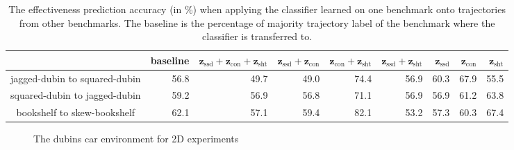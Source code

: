 \documentclass[letterpaper, 10 pt, conference]{ieeeconf}  %
\newcommand{\fssd}{\mbox{$\mathbf z_{\text{ssd}}$}}
\newcommand{\fcon}{\mbox{$\mathbf z_{\text{con}}$}}
\newcommand{\fsht}{\mbox{$\mathbf z_{\text{sht}}$}}
\begin{document}
\begin{table}[tbp]
\centering
\begin{tabular}{|c|r|r|r|r|r|r|r|r|}
\hline 
 & baseline & $\fssd+\fcon+\fsht$ & $\fssd+\fcon$ & $\fcon+\fsht$ & $\fssd+\fsht$ & $\fssd$ & $\fcon$ & $\fsht$ \\ \hline \hline
jagged-dubin to squared-dubin &  56.8 & 49.7 & 49.0 &	74.4 & 	56.9 & 	60.3	 & 67.9	& 55.5
 \\ \hline
squared-dubin to jagged-dubin & 59.2 & 56.9 &	56.8 &	71.1 & 	56.9 &	56.9 &	61.2 &	63.8 \\ \hline
bookshelf to skew-bookshelf & 62.1 & 57.1 &	59.4 &	82.1 & 	53.2 &	57.3 &	60.3 &	67.4 \\ \hline
\end{tabular}
\caption{The effectiveness prediction accuracy (in \%) when applying the classifier learned on one benchmark onto trajectories from other benchmarks. The baseline is the percentage of majority trajectory label of the benchmark where the classifier is transferred to.}
\label{tab:result2}
\end{table}



\begin{figure}[t]
\centering
{}
\caption{The dubins car environment for 2D experiments}
\label{fig:benchmarks1}
\end{figure}
\end{document}
